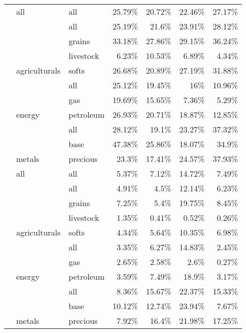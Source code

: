 \documentclass[]{elsarticle} %
\begin{document}
\begin{longtable}[t]{>{}lllrrrr}
\endfoot
\bottomrule
\endlastfoot
 & all & all & 25.79\% & 20.72\% & 22.46\% & 27.17\%\\
\nopagebreak
 &  & all & 25.19\% & 21.6\% & 23.91\% & 28.12\%\\
\nopagebreak
 &  & grains & 33.18\% & 27.86\% & 29.15\% & 36.24\%\\
\nopagebreak
 &  & livestock & 6.23\% & 10.53\% & 6.89\% & 4.34\%\\
\nopagebreak
 & \multirow[t]{-4}{*}{\raggedright\arraybackslash agriculturals} & softs & 26.68\% & 20.89\% & 27.19\% & 31.88\%\\
\nopagebreak
 &  & all & 25.12\% & 19.45\% & 16\% & 10.96\%\\
\nopagebreak
 &  & gas & 19.69\% & 15.65\% & 7.36\% & 5.29\%\\
\nopagebreak
 & \multirow[t]{-3}{*}{\raggedright\arraybackslash energy} & petroleum & 26.93\% & 20.71\% & 18.87\% & 12.85\%\\
\nopagebreak
 &  & all & 28.12\% & 19.1\% & 23.27\% & 37.32\%\\
\nopagebreak
 &  & base & 47.38\% & 25.86\% & 18.07\% & 34.9\%\\
\nopagebreak
\multirow[t]{-11}{*}{\raggedright\arraybackslash \textbf{Δ\% commodity CHP}} & \multirow[t]{-3}{*}{\raggedright\arraybackslash metals} & precious & 23.3\% & 17.41\% & 24.57\% & 37.93\%\\
\cmidrule{1-7}\pagebreak[0]
 & all & all & 5.37\% & 7.12\% & 14.72\% & 7.49\%\\
\nopagebreak
 &  & all & 4.91\% & 4.5\% & 12.14\% & 6.23\%\\
\nopagebreak
 &  & grains & 7.25\% & 5.4\% & 19.75\% & 8.45\%\\
\nopagebreak
 &  & livestock & 1.35\% & 0.41\% & 0.52\% & 0.26\%\\
\nopagebreak
 & \multirow[t]{-4}{*}{\raggedright\arraybackslash agriculturals} & softs & 4.34\% & 5.64\% & 10.35\% & 6.98\%\\
\nopagebreak
 &  & all & 3.35\% & 6.27\% & 14.83\% & 2.45\%\\
\nopagebreak
 &  & gas & 2.65\% & 2.58\% & 2.6\% & 0.27\%\\
\nopagebreak
 & \multirow[t]{-3}{*}{\raggedright\arraybackslash energy} & petroleum & 3.59\% & 7.49\% & 18.9\% & 3.17\%\\
\nopagebreak
 &  & all & 8.36\% & 15.67\% & 22.37\% & 15.33\%\\
\nopagebreak
 &  & base & 10.12\% & 12.74\% & 23.94\% & 7.67\%\\
\nopagebreak
\multirow[t]{-11}{*}{\raggedright\arraybackslash \textbf{Δ\% aggregate CHP}} & \multirow[t]{-3}{*}{\raggedright\arraybackslash metals} & precious & 7.92\% & 16.4\% & 21.98\% & 17.25\%\\*
\end{longtable}
\endgroup{}
\end{document}
